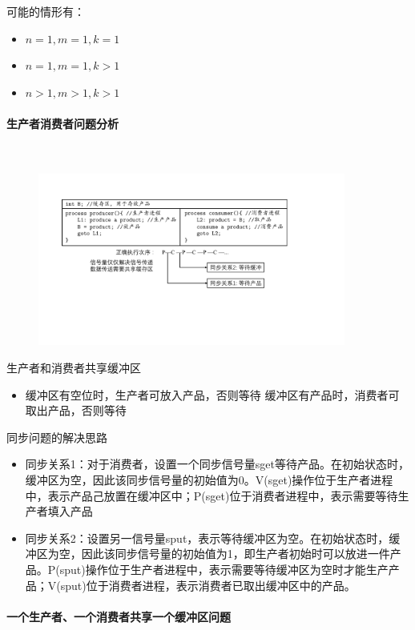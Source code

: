 \documentclass[cs4size,a4paper,10pt]{ctexart}
\begin{document}
	可能的情形有：
	\begin{itemize}
		\item $n=1,m=1,k=1$
		\item $n=1,m=1,k>1$
		\item $n>1,m>1,k>1$
	\end{itemize}

	\paragraph{生产者消费者问题分析}~{}

	\begin{figure}[H]
		\centering
		\includegraphics[width=0.9\textwidth]{img/生产者-消费者问题的程序框架.pdf}
	\end{figure}

	生产者和消费者共享缓冲区
	\begin{itemize}
		\item 缓冲区有空位时，生产者可放入产品，否则等待
		缓冲区有产品时，消费者可取出产品，否则等待
	\end{itemize}

	同步问题的解决思路
	\begin{itemize}
		\item 同步关系1：对于消费者，设置一个同步信号量sget等待产品。在初始状态时，缓冲区为空，因此该同步信号量的初始值为0。V(sget)操作位于生产者进程中，表示产品己放置在缓冲区中；P(sget)位于消费者进程中，表示需要等待生产者填入产品
		\item 同步关系2：设置另一信号量sput，表示等待缓冲区为空。在初始状态时，缓冲区为空，因此该同步信号量的初始值为1，即生产者初始时可以放进一件产品。P(sput)操作位于生产者进程中，表示需要等待缓冲区为空时才能生产产品；V(sput)位于消费者进程，表示消费者已取出缓冲区中的产品。
	\end{itemize}

	\paragraph{一个生产者、一个消费者共享一个缓冲区问题}~{}
\end{document}
